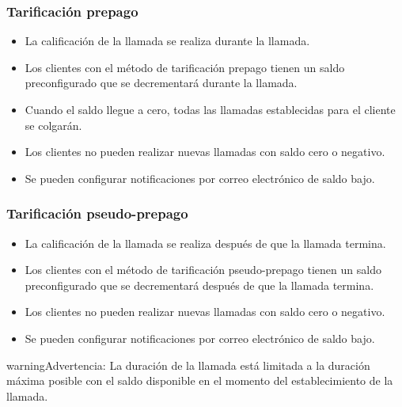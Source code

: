 \documentclass[letterpaper,10pt,spanish]{sphinxmanual}
\begin{document}
\subsubsection{Tarificación prepago}
\label{administration_portal/brand/billing/index:prepaid-billing}\label{administration_portal/brand/billing/index:id3}\begin{itemize}
\item {} 
La calificación de la llamada se realiza durante la llamada.

\item {} 
Los clientes con el método de tarificación prepago tienen un saldo preconfigurado que se decrementará durante la llamada.

\item {} 
Cuando el saldo llegue a cero, todas las llamadas establecidas para el cliente se colgarán.

\item {} 
Los clientes no pueden realizar nuevas llamadas con saldo cero o negativo.

\item {} 
Se pueden configurar notificaciones por correo electrónico de saldo bajo.

\end{itemize}


\subsubsection{Tarificación pseudo-prepago}
\label{administration_portal/brand/billing/index:id4}\label{administration_portal/brand/billing/index:pseudo-prepaid-billing}\begin{itemize}
\item {} 
La calificación de la llamada se realiza después de que la llamada termina.

\item {} 
Los clientes con el método de tarificación pseudo-prepago tienen un saldo preconfigurado que se decrementará después de que la llamada termina.

\item {} 
Los clientes no pueden realizar nuevas llamadas con saldo cero o negativo.

\item {} 
Se pueden configurar notificaciones por correo electrónico de saldo bajo.

\end{itemize}

\begin{notice}{warning}{Advertencia:}
La duración de la llamada está limitada a la duración máxima posible con el saldo disponible en el momento del establecimiento de la llamada.
\end{notice}
\end{document}
